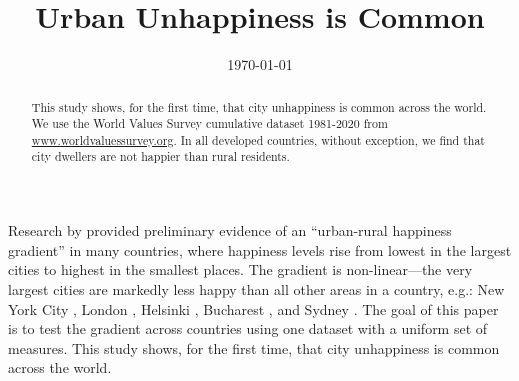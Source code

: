 \documentclass[11pt, letterpaper]{article}
\date{{}\today  \hspace{.2in}\xxivtime}
\title{  %
Urban Unhappiness is Common %
}
\author{
}
\begin{document}


\maketitle
\vspace{-.4in}
\begin{center}

\end{center}


\begin{abstract}
\noindent This study shows, for the first time, that city unhappiness is 
common across the world. We use the World Values Survey cumulative dataset
1981-2020 from \url{www.worldvaluessurvey.org}. 
In all developed countries, %
 without exception, we find that city dwellers are not happier than rural
residents.  
\end{abstract}
\vspace{.15in} 
\vspace{.25in} 

Research by \citet{aok11a} provided preliminary evidence of an ``urban-rural happiness gradient'' in many countries, where happiness levels rise from lowest in the largest cities to highest in the smallest places. The gradient is non-linear---the very largest cities are markedly less happy than all other areas in a country, e.g.: New York City \citep{aok_brfss_city_cize16,senior_ny_sep16_14}, London \citep{ons11,ibt13}, Helsinki \citep{morrison15}, Bucharest \citep{lenzi16D}, and Sydney \citep[cited in][]{morrison11}.
The goal of this paper is to test the gradient across countries using one dataset with a uniform set of measures. This study shows, for the first time, that city unhappiness is common across the world.%
 
\end{document}
